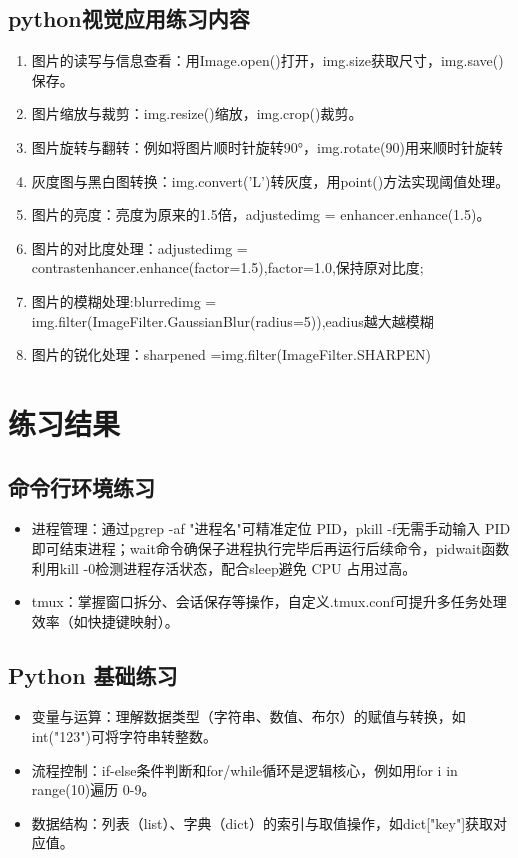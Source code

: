 \documentclass[10.5pt]{ctexart}
\begin{document}
\subsection{python视觉应用练习内容}
\begin{enumerate}
    \item 图片的读写与信息查看：用Image.open()打开，img.size获取尺寸，img.save()保存。
    \item 图片缩放与裁剪：img.resize()缩放，img.crop()裁剪。
    \item 图片旋转与翻转：例如将图片顺时针旋转90°，img.rotate(90)用来顺时针旋转
    \item 灰度图与黑白图转换：img.convert('L')转灰度，用point()方法实现阈值处理。
    \item 图片的亮度：亮度为原来的1.5倍，adjustedimg = enhancer.enhance(1.5)。
    \item 图片的对比度处理：adjustedimg = contrastenhancer.enhance(factor=1.5),factor=1.0,保持原对比度;
    \item 图片的模糊处理:blurredimg = img.filter(ImageFilter.GaussianBlur(radius=5)),eadius越大越模糊
    \item 图片的锐化处理：sharpened =img.filter(ImageFilter.SHARPEN)
\end{enumerate}

\section{练习结果}
\subsection{命令行环境练习}
\begin{itemize}
\item 进程管理：通过pgrep -af "进程名"可精准定位 PID，pkill -f无需手动输入 PID 即可结束进程；wait命令确保子进程执行完毕后再运行后续命令，pidwait函数利用kill -0检测进程存活状态，配合sleep避免 CPU 占用过高。
\item tmux：掌握窗口拆分、会话保存等操作，自定义.tmux.conf可提升多任务处理效率（如快捷键映射）。
\end{itemize}

\subsection{Python 基础练习}
\begin{itemize}
\item 变量与运算：理解数据类型（字符串、数值、布尔）的赋值与转换，如int("123")可将字符串转整数。
\item 流程控制：if-else条件判断和for/while循环是逻辑核心，例如用for i in range(10)遍历 0-9。
\item 数据结构：列表（list）、字典（dict）的索引与取值操作，如dict["key"]获取对应值。
\end{itemize}
\end{document}
